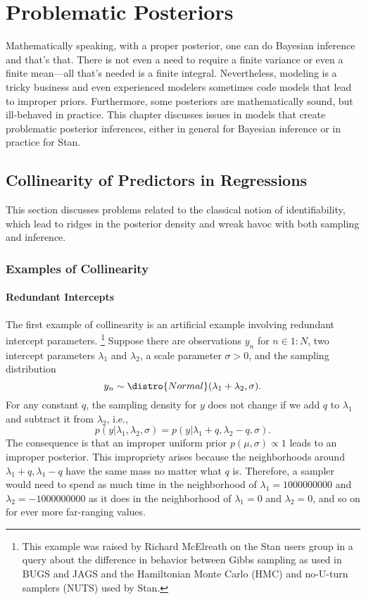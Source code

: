 \chapter{Problematic Posteriors}\label{problematic-posteriors.chapter}%
\noindent
Mathematically speaking, with a proper posterior, one can do Bayesian
inference and that's that. There is not even a need to require a
finite variance or even a finite mean---all that's needed is a finite
integral.  Nevertheless, modeling is a tricky business and even
experienced modelers sometimes code models that lead to improper
priors.  Furthermore, some posteriors are mathematically sound, but
ill-behaved in practice.  This chapter discusses issues in models that
create problematic posterior inferences, either in general for
Bayesian inference or in practice for Stan.


\section{Collinearity of Predictors in Regressions}\label{collinearity.section}

This section discusses problems related to the classical notion of
identifiability, which lead to ridges in the posterior density and
wreak havoc with both sampling and inference.

\subsection{Examples of Collinearity}

\subsubsection{Redundant Intercepts}

The first example of collinearity is an artificial example involving
redundant intercept parameters.%
%
\footnote{This example was raised by Richard McElreath on the Stan
  users group in a query about the difference in behavior between
  Gibbs sampling as used in BUGS and JAGS and the Hamiltonian Monte
  Carlo (HMC) and no-U-turn samplers (NUTS) used by Stan.}
%
Suppose there are observations $y_n$ for $n \in 1{:}N$, 
two intercept parameters $\lambda_1$ and
$\lambda_2$, a scale parameter $\sigma > 0$, and the sampling distribution
%
\[
y_n \sim \distro{Normal}(\lambda_1 + \lambda_2, \sigma).
\]
%
For any constant $q$, the sampling density for $y$ does not change if
we add $q$ to $\lambda_1$ and subtract it from $\lambda_2$, i.e.,
%
\[
p(y | \lambda_1, \lambda_2,\sigma)
=
p(y | \lambda_1 + q, \lambda_2 - q, \sigma).
\]
%
The consequence is that an improper uniform prior $p(\mu,\sigma)
\propto 1$ leads to an improper posterior.  This impropriety arises
because the neighborhoods around $\lambda_1 + q, \lambda_1 - q$ have
the same mass no matter what $q$ is.  Therefore, a sampler would need
to spend as much time in the neighborhood of $\lambda_1=1000000000$
and $\lambda_2=-1000000000$ as it does in the neighborhood of
$\lambda_1=0$ and $\lambda_2=0$, and so on for ever more far-ranging
values.

